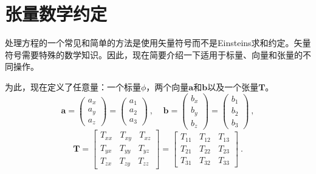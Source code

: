 \documentclass[LBMDerivation.tex]{subfiles}
\begin{document}
\section{张量数学约定}
%
%
	处理方程的一个常见和简单的方法是使用矢量符号而不是Einsteins求和约定。矢量符号需要特殊的数学知识。因此，现在简要介绍一下适用于标量、向量和张量的不同操作。

	为此，现在定义了任意量：一个标量$\phi$，两个向量$\textbf{a}$和$\textbf{b}$以及一个张量$\textbf{T}$。
%
%
\begin{equation*}
  \textbf{a}
=
  \left(
  \begin{matrix}
    a_x \\ a_y \\ a_z
  \end{matrix}
  \right)
=
  \left(
  \begin{matrix}
    a_1 \\ a_2 \\ a_3
  \end{matrix}
  \right)
  ~,~~~~~
  \textbf{b}
=
  \left(
  \begin{matrix}
    b_x \\ b_y \\ b_z
  \end{matrix}
  \right)
=
  \left(
  \begin{matrix}
    b_1 \\ b_2 \\ b_3
  \end{matrix}
  \right)
  ~,
\end{equation*}
%
%
\begin{equation*}
  \textbf{T}
=
  \left[
  \begin{matrix}
   T_{xx} ~ ~ ~ ~ T_{xy} ~ ~ ~ ~ T_{xz} \\
   T_{yx} ~ ~ ~ ~ T_{yy} ~ ~ ~ ~ T_{yz} \\
   T_{zx} ~ ~ ~ ~ T_{zy} ~ ~ ~ ~ T_{zz}
  \end{matrix}
  \right]
=
  \left[
  \begin{matrix}
   T_{11} ~ ~ ~ ~ T_{12} ~ ~ ~ ~ T_{13} \\
   T_{21} ~ ~ ~ ~ T_{22} ~ ~ ~ ~ T_{23} \\
   T_{31} ~ ~ ~ ~ T_{32} ~ ~ ~ ~ T_{33}
  \end{matrix}
  \right] ~.
\end{equation*}
%
%
\end{document}
